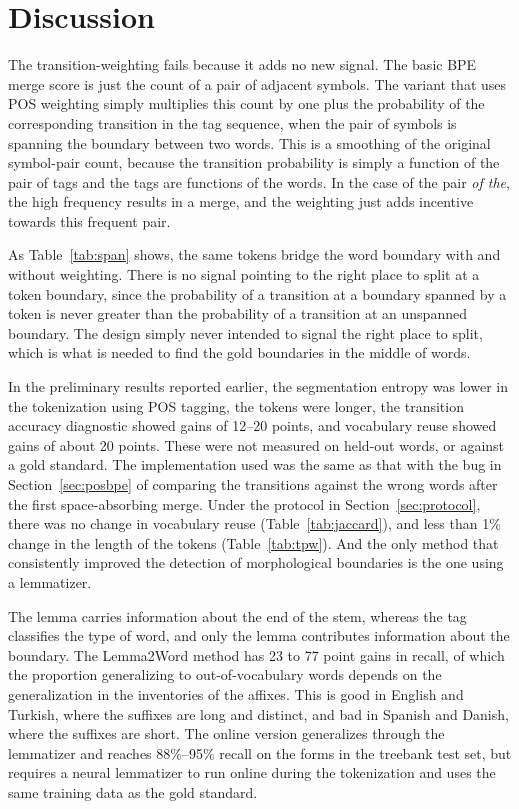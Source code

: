 \section{Discussion}\label{sec:discussion}

The transition-weighting fails because it adds no new signal.
The basic BPE merge score is just the count of a pair of adjacent symbols.
The variant that uses POS weighting simply multiplies this count by one plus the probability of the corresponding transition in the tag sequence, when the pair of symbols is spanning the boundary between two words.
This is a smoothing of the original symbol-pair count, because the transition probability is simply a function of the pair of tags and the tags are functions of the words.
In the case of the pair \emph{of the}, the high frequency results in a merge, and the weighting just adds incentive towards this frequent pair.

As Table~\ref{tab:span} shows, the same tokens bridge the word boundary with and without weighting.
There is no signal pointing to the right place to split at a token boundary, since the probability of a transition at a boundary spanned by a token is never greater than the probability of a transition at an unspanned boundary.
The design simply never intended to signal the right place to split, which is what is needed to find the gold boundaries in the middle of words.

In the preliminary results reported earlier, the segmentation entropy was lower in the tokenization using POS tagging, the tokens were longer, the transition accuracy diagnostic showed gains of 12--20 points, and vocabulary reuse showed gains of about 20 points.
These were not measured on held-out words, or against a gold standard.
The implementation used was the same as that with the bug in Section~\ref{sec:posbpe} of comparing the transitions against the wrong words after the first space-absorbing merge.
Under the protocol in Section~\ref{sec:protocol}, there was no change in vocabulary reuse (Table~\ref{tab:jaccard}), and less than 1\% change in the length of the tokens (Table~\ref{tab:tpw}).
And the only method that consistently improved the detection of morphological boundaries is the one using a lemmatizer.

The lemma carries information about the end of the stem, whereas the tag classifies the type of word, and only the lemma contributes information about the boundary.
The Lemma2Word method has 23 to 77 point gains in recall, of which the proportion generalizing to out-of-vocabulary words depends on the generalization in the inventories of the affixes.
This is good in English and Turkish, where the suffixes are long and distinct, and bad in Spanish and Danish, where the suffixes are short.
The online version generalizes through the lemmatizer and reaches 88\%--95\% recall on the forms in the treebank test set, but requires a neural lemmatizer to run online during the tokenization and uses the same training data as the gold standard.

